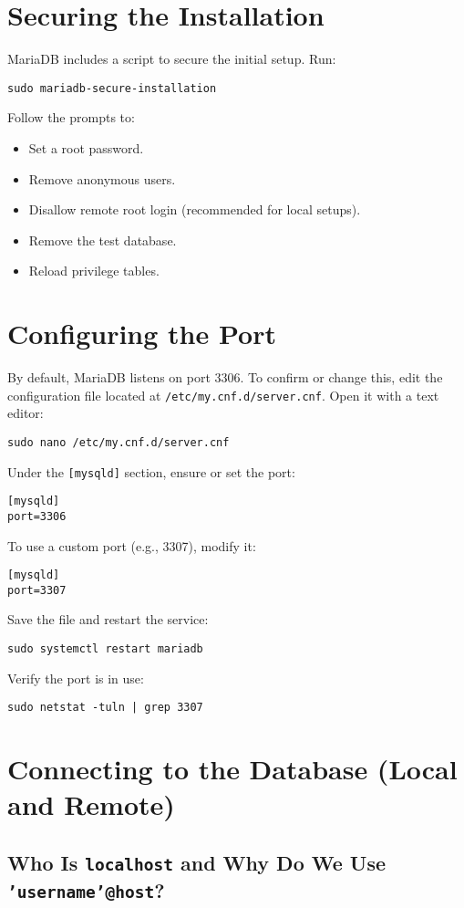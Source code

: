 \documentclass[10pt]{article}
\begin{document}
\section{Securing the Installation}
MariaDB includes a script to secure the initial setup. Run:
\begin{lstlisting}
sudo mariadb-secure-installation
\end{lstlisting}
Follow the prompts to:
\begin{itemize}
    \item Set a root password.
    \item Remove anonymous users.
    \item Disallow remote root login (recommended for local setups).
    \item Remove the test database.
    \item Reload privilege tables.
\end{itemize}

\section{Configuring the Port}
By default, MariaDB listens on port 3306. To confirm or change this, edit the configuration file located at \texttt{/etc/my.cnf.d/server.cnf}. Open it with a text editor:
\begin{lstlisting}
sudo nano /etc/my.cnf.d/server.cnf
\end{lstlisting}
Under the \texttt{[mysqld]} section, ensure or set the port:
\begin{lstlisting}
[mysqld]
port=3306
\end{lstlisting}
To use a custom port (e.g., 3307), modify it:
\begin{lstlisting}
[mysqld]
port=3307
\end{lstlisting}
Save the file and restart the service:
\begin{lstlisting}
sudo systemctl restart mariadb
\end{lstlisting}
Verify the port is in use:
\begin{lstlisting}
sudo netstat -tuln | grep 3307
\end{lstlisting}

\section{Connecting to the Database (Local and Remote)}
\subsection{Who Is \texttt{localhost} and Why Do We Use \texttt{'username'@\textquotesingle host\textquotesingle}?}
\end{document}
